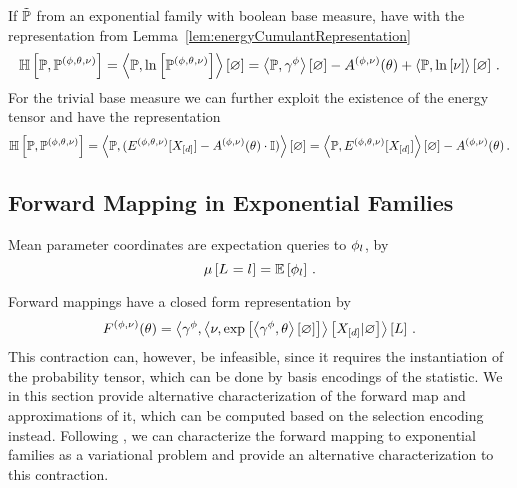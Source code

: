 \begin{example}\label{exa:cEntropyExp}
	If $\tilde{\mathbb{P}}$ from an exponential family with boolean base measure, have with the representation from Lemma~\ref{lem:energyCumulantRepresentation}
	\begin{align*}
		\mathbb{H}\left[\mathbb{P},\mathbb{P}^{(\phi,\theta,\nu)}\right] 
		= \left\langle \mathbb{P},\ln \left[ \mathbb{P}^{(\phi,\theta,\nu)} \right]\right\rangle \left[ \varnothing \right] 
		= \left\langle \mathbb{P},\gamma^{\phi}\right\rangle \left[ \varnothing \right] - A^{(\phi,\nu)}(\theta) + \left\langle \mathbb{P},\ln \left[ \nu \right]\right\rangle \left[ \varnothing \right] \, . 
	\end{align*}
	For the trivial base measure we can further exploit the existence of the energy tensor and have the representation
		\[ \mathbb{H}\left[\mathbb{P},\mathbb{P}^{(\phi,\theta,\nu)}\right] = \left\langle \mathbb{P},(E^{(\phi,\theta,\nu)}[X_{[d]}]-A^{(\phi,\nu)}(\theta)\cdot \mathbb{I})\right\rangle \left[ \varnothing \right]
		=   \left\langle \mathbb{P},E^{(\phi,\theta,\nu)}[X_{[d]}]\right\rangle \left[ \varnothing \right] -A^{(\phi,\nu)}(\theta) \, .   \]
\end{example}




\subsection{Forward Mapping in Exponential Families} 




Mean parameter coordinates are expectation queries to $\phi_{l}$, by 
	\[ \mu\left[L_{}=l_{}\right] = \mathbb{E}\left[\phi_{l}\right] \, . \]
	
Forward mappings have a closed form representation by
	\[ F^{(\phi,\nu)}(\theta)
	= \left\langle \gamma^{\phi},\left\langle \nu,\mathrm{exp}\left[\left\langle \gamma^{\phi},\theta\right\rangle \left[ \varnothing \right]\right]\right\rangle \left[ X_{[d]} | \varnothing \right]\right\rangle \left[ L \right] \, . \]
This contraction can, however, be infeasible, since it requires the instantiation of the probability tensor, which can be done by basis encodings of the statistic.
We in this section provide alternative characterization of the forward map and approximations of it, which can be computed based on the selection encoding instead.
Following \cite{wainwright_graphical_2008}, we can characterize the forward mapping to exponential families as a variational problem and provide an alternative characterization to this contraction.



